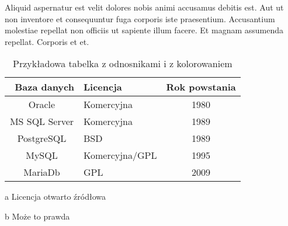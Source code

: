 Aliquid aspernatur est velit dolores nobis animi accusamus debitis est. Aut ut non inventore et consequuntur fuga corporis iste praesentium. Accusantium molestiae repellat non officiis ut sapiente illum facere. Et magnam assumenda repellat. Corporis et et.

\begin{table}[tbh] \small
    \centering
    \caption{Przykładowa tabelka z odnosnikami i z kolorowaniem}
    \label{tab:przyklad_pierwszy}
    \begin{threeparttable}
        \begin{tabular}{|c|l|c|} \hline \tableheadercolor \
            Baza danych   & Licencja                & Rok powstania \\ \hline \hline
            Oracle        & Komercyjna              & 1980          \\ \hline
            MS SQL Server & Komercyjna              & 1989          \\ \hline
            PostgreSQL    & BSD\tnote{a}            & 1989          \\ \hline
            MySQL         & Komercyjna/GPL\tnote{a} & 1995          \\ \hline
            MariaDb       & GPL\tnote{a}            & 2009\tnote{b} \\ \hline
        \end{tabular}

        \begin{tablenotes}
            \item[a] Licencja otwarto źródłowa
            \item[b] Może to prawda
        \end{tablenotes}
    \end{threeparttable}
\end{table}

